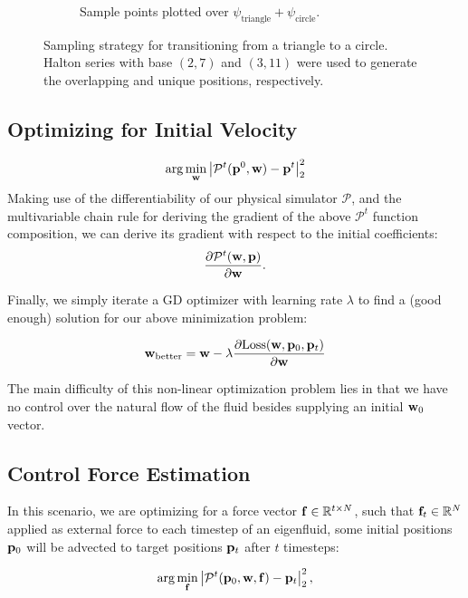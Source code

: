 \begin{figure}
\begin{subfigure}[t]{0.48\textwidth}
    \caption{Sample points plotted over $\psi_\text{triangle}
    + \psi_\text{circle}$.}
  \end{subfigure}\par\medskip
  \caption{Sampling strategy for transitioning from a triangle to a circle.
  Halton series with base $(2,7)$ and $(3,11)$ were used to generate the
  overlapping and unique positions, respectively.}
  \label{fig:sampling}
\end{figure}


\subsection{Optimizing for Initial Velocity}\label{section:initial-velocity}

$$
\arg\min_{\vb{w}} \left| \mathcal{P}^{t}(\vb{p}^0, \vb{w})
  - \vb{p}^t\right|_2^2
  $$
Making use of the differentiability of our physical simulator $\mathcal{P}$, and
the multivariable chain rule for deriving the gradient of the above
$\mathcal{P}^t$ function composition, we can derive its gradient with respect to
the initial coefficients: $$\frac{\partial
\mathcal{P}^t(\vb{w},\vb{p})}{\partial \vb{w}}.$$

Finally, we simply iterate a \ac{GD} optimizer with learning rate $\lambda$ to
find a (good enough) solution for our above minimization problem:

$$\vb{w}_{\text{better}} = \vb{w} - \lambda
\frac{
    \partial\text{Loss}(\vb{w}, \vb{p}_0, \vb{p}_t)
}{
    \partial \vb{w}
}$$

The main difficulty of this non-linear optimization problem lies in that we have
no control over the natural flow of the fluid besides supplying an initial
$\vb{w}_0$ vector.

\subsection{Control Force Estimation}\label{section:cfe}
In this scenario, we are optimizing for a force vector $\vb{f} \in
\mathbb{R}^{t\times N}$, such that $\vb{f}_t \in \mathbb{R}^N$ applied as
external force to each timestep of an eigenfluid, some initial positions
$\vb{p}_0$ will be advected to target positions $\vb{p}_t$ after $t$ timesteps:

$$\arg\min_{\vb{f}} \left| \mathcal{P}^{t}(\vb{p}_0, \vb{w}, \vb{f})
  - \vb{p}_t\right|_2^2,$$

